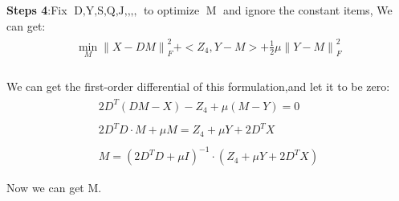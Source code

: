 \documentclass{article}
\begin{document}
\begin{flushleft}
\textbf{Steps 4}:\;\;Fix $\mathop{D,Y,S,Q,J,Z_1,Z_2,Z_3,Z_4}$ to optimize $\mathop{M}$ and ignore the constant items, We can get:
\begin{eqnarray}
\begin{array}{lll}
    \mathop{\min}\limits_{M} {\parallel X - DM \parallel}_F^2 + <Z_4, Y-M> + \frac{1}{2}\mu {\parallel Y - M \parallel}_F^2
\end{array}
\end{eqnarray}\\
We can get the first-order differential of this formulation,and let it to be zero:
\begin{eqnarray}
\begin{array}{lll}
    2 D^T(DM-X) - Z_4 + \mu(M-Y) = 0 \nonumber \\\\
    2 D^TD\cdot M + \mu M = Z_4+\mu Y + 2D^TX\\\\
    M = (2D^TD+\mu I)^{-1} \cdot (Z_4+\mu Y + 2D^TX)\\\\
\end{array}
\end{eqnarray}
Now we can get M.\\
\end{flushleft}
\end{document}
